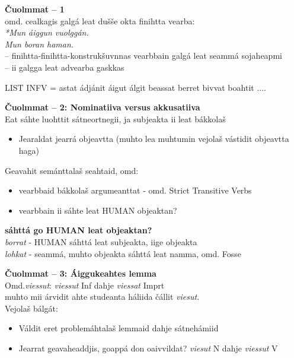 \documentclass[landscape,norsk,11pt]{seminar}
\begin{document}
\begin{slide}
\newslide
\textbf{Čuolmmat -- 1} \\
omd. cealkagis galgá leat dušše okta finihtta vearba: \\
\textit{*Mun áiggun vuolggán.}\\
\textit{Mun boran haman.}\\
-- finihtta-finihtta-konstrukšuvnnas vearbbain galgá leat seammá sojaheapmi\\
-- ii galgga leat advearba gaskkas

\newslide

LIST INFV =  astat ádjánit áigut álgit beassat berret bivvat boahtit ....

\newslide
\textbf{Čuolmmat -- 2: Nominatiiva versus akkusatiiva} \\
Eat sáhte luohttit sátneortnegii, ja subjeakta ii leat bákkolaš
\begin{itemize}
\item Jearaldat jearrá objeavtta (muhto lea muhtumin vejolaš vástidit objeavtta haga)
\end{itemize}
Geavahit semánttalaš seahtaid, omd: 
\begin{itemize}
\item vearbbaid bákkolaš argumeanttat - omd.  Strict Transitive Verbs
\item vearbbain ii sáhte leat HUMAN objeaktan? 
\end{itemize}

\newslide
\textbf{sáhttá go HUMAN leat objeaktan?} \\

 \textit{borrat}   - HUMAN sáhttá leat subjeakta, iige objeakta \\
  \textit{lohkat}  - seammá, muhto objeakta sáhttá leat namma, omd. Fosse


\newslide
\textbf{Čuolmmat -- 3: Áiggukeahtes lemma} \\
 
Omd.\textit{viessut}: \textit{viessut} Inf dahje \textit{viessat} Imprt \\
muhto mii árvidit ahte studeanta háliida čállit \textit{viesut}. \\
Vejolaš bálgát:

\begin{itemize}
\item{Váldit eret problemáhtalaš lemmaid dahje sátnehámiid}
\item{Jearrat geavaheaddjis, goappá don oaivvildat? \textit{viesut}  N dahje \textit{viessut} V }
\end{itemize}



\end{slide}
\end{document}
